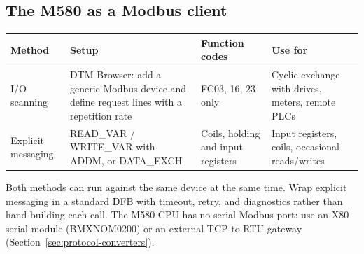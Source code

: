 \subsection*{The M580 as a Modbus client}
\begin{longtable}{@{}P{3.00cm}P{4.60cm}P{3.00cm}P{4.60cm}@{}}
\toprule
\textbf{Method} & \textbf{Setup} & \textbf{Function codes} & \textbf{Use for} \\
\midrule
\endhead
I/O scanning & DTM Browser: add a generic Modbus device and define request lines with a repetition rate & FC03, 16, 23 only & Cyclic exchange with drives, meters, remote PLCs \\
Explicit messaging & READ\_VAR / WRITE\_VAR with ADDM, or DATA\_EXCH & Coils, holding and input registers & Input registers, coils, occasional reads/writes \\
\bottomrule
\end{longtable}
Both methods can run against the same device at the same time. Wrap explicit messaging in a standard DFB with timeout, retry, and diagnostics rather than hand-building each call. The M580 CPU has no serial Modbus port: use an X80 serial module (BMXNOM0200) or an external TCP-to-RTU gateway (Section~\ref{sec:protocol-converters}).

